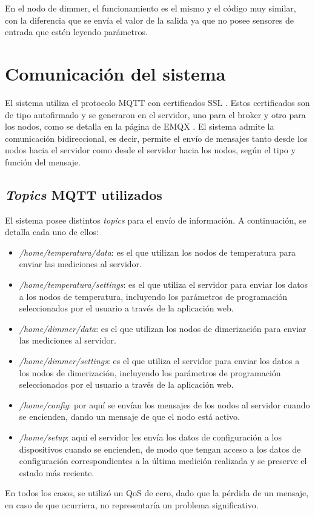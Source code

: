 En el nodo de dimmer, el funcionamiento es el mismo y el código muy similar, con la diferencia que se envía el valor de la salida ya que no posee sensores de entrada que estén leyendo parámetros.

\section{Comunicación del sistema}

El sistema utiliza el protocolo MQTT con certificados SSL \citep{39}. Estos certificados son de tipo autofirmado y se generaron en el servidor, uno para el broker y otro para los nodos, como se detalla en la página de EMQX \citep{40}. El sistema admite la comunicación bidireccional, es decir, permite el envío de mensajes tanto desde los nodos hacia el servidor como desde el servidor hacia los nodos, según el tipo y función del mensaje.

\subsection{\textit{Topics} MQTT utilizados}

El sistema posee distintos \textit{topics} para el envío de información. A continuación, se detalla cada uno de ellos:

\begin{itemize}
	\item \textit{/home/temperatura/data}: es el que utilizan los nodos de temperatura para enviar las mediciones al servidor.
	\item \textit{/home/temperatura/settings}: es el que utiliza el servidor para enviar los datos a los nodos de temperatura, incluyendo los parámetros de programación seleccionados por el usuario a través de la aplicación web.
	\item \textit{/home/dimmer/data}: es el que utilizan los nodos de dimerización para enviar las mediciones al servidor.
	\item \textit{/home/dimmer/settings}: es el que utiliza el servidor para enviar los datos a los nodos de dimerización, incluyendo los parámetros de programación seleccionados por el usuario a través de la aplicación web.
	\item \textit{/home/config}: por aquí se envían los mensajes de los nodos al servidor cuando se encienden, dando un mensaje de que el nodo está activo.
	\item \textit{/home/setup}: aquí el servidor les envía los datos de configuración a los dispositivos cuando se encienden, de modo que tengan acceso a los datos de configuración correspondientes a la última medición realizada y se preserve el estado más reciente.
\end{itemize}

En todos los casos, se utilizó un QoS de cero, dado que la pérdida de un mensaje, en caso de que ocurriera, no representaría un problema significativo.